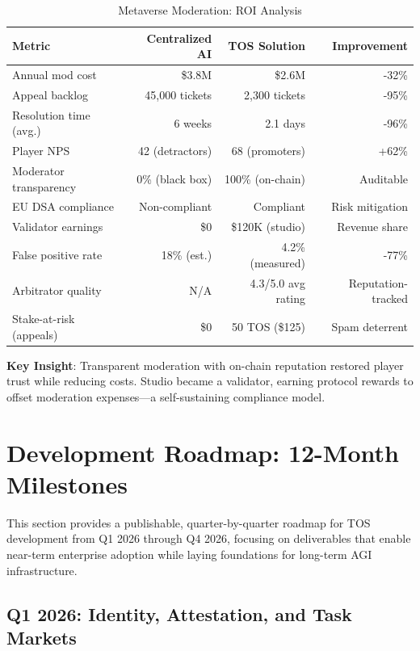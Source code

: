 \documentclass[11pt]{article}
\begin{document}
\begin{table}[H]
\centering
\caption{Metaverse Moderation: ROI Analysis}
\label{tab:metaverse-roi}
\begin{tabular}{@{}lrrr@{}}
\toprule
\textbf{Metric} & \textbf{Centralized AI} & \textbf{TOS Solution} & \textbf{Improvement} \\ \midrule
Annual mod cost & \$3.8M & \$2.6M & -32\% \\
Appeal backlog & 45,000 tickets & 2,300 tickets & -95\% \\
Resolution time (avg.) & 6 weeks & 2.1 days & -96\% \\
Player NPS & 42 (detractors) & 68 (promoters) & +62\% \\
Moderator transparency & 0\% (black box) & 100\% (on-chain) & Auditable \\
EU DSA compliance & Non-compliant & Compliant & Risk mitigation \\
Validator earnings & \$0 & \$120K (studio) & Revenue share \\
False positive rate & 18\% (est.) & 4.2\% (measured) & -77\% \\
Arbitrator quality & N/A & 4.3/5.0 avg rating & Reputation-tracked \\
Stake-at-risk (appeals) & \$0 & 50 TOS (\$125) & Spam deterrent \\
\bottomrule
\end{tabular}
\end{table}

\textbf{Key Insight}: Transparent moderation with on-chain reputation restored player trust while reducing costs. Studio became a validator, earning protocol rewards to offset moderation expenses—a self-sustaining compliance model.

\section{Development Roadmap: 12-Month Milestones}
\label{sec:12month-roadmap}

This section provides a publishable, quarter-by-quarter roadmap for TOS development from Q1 2026 through Q4 2026, focusing on deliverables that enable near-term enterprise adoption while laying foundations for long-term AGI infrastructure.

\subsection{Q1 2026: Identity, Attestation, and Task Markets}
\end{document}
